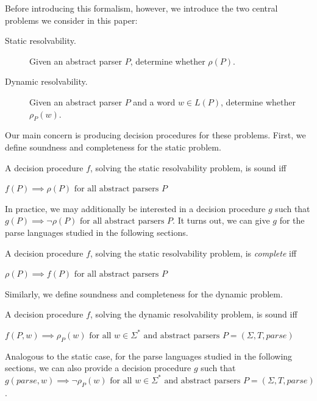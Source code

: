 \documentclass[runningheads]{llncs}
\newcommand{\T}{\Sigma} %
\newcommand{\parse}{\mathit{parse}} %
\begin{document}
Before introducing this formalism, however, we introduce the two central problems we consider in this paper:

\begin{description}
\item[Static resolvability.] Given an abstract parser $P$, determine whether $\rho(P)$.
\item[Dynamic resolvability.] Given an abstract parser $P$ and a word $w \in L(P)$, determine whether $\rho_P(w)$.
\end{description}

\noindent Our main concern is producing decision procedures for these problems. First, we define soundness and completeness for the static problem.

\begin{definition}\label{def:static-procedure-sound}
  A decision procedure $f$, solving the static resolvability problem, is sound iff

  $f(P) \implies \rho(P) \text{ for all abstract parsers } P$
\end{definition}

In practice, we may additionally be interested in a decision procedure
$g$ such that $g(P) \implies \lnot \rho(P) \text{ for all abstract
  parsers } P$. It turns out, we can give $g$ for the parse languages
studied in the following sections.

\begin{definition}\label{def:static-procedure-complete}
  A decision procedure $f$, solving the static resolvability problem, is \emph{complete} iff

  $\rho(P) \implies f(P) \text{ for all abstract parsers } P$
\end{definition}


\noindent Similarly, we define soundness and completeness for the dynamic problem.

\begin{definition}\label{def:dynamic-procedure-sound}
  A decision procedure $f$, solving the dynamic resolvability problem, is sound iff

  $f(P, w) \implies \rho_P(w) \text{ for all } w \in \Sigma^{*} \text{ and abstract parsers } P = (\T, T, \parse)$
\end{definition}

\noindent Analogous to the static case, for the parse languages studied in the
following sections, we can also provide a decision procedure $g$ such
that $g(\parse, w) \implies \lnot \rho_P(w) \text{ for all } w \in
\Sigma^{*} \text{ and abstract parsers } P = (\T, T, \parse)$.
\end{document}
